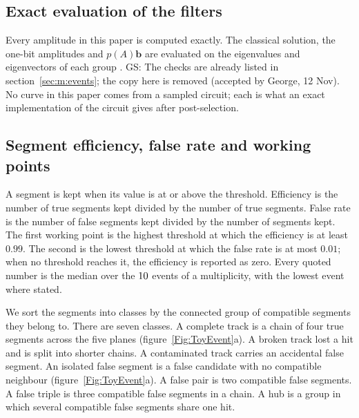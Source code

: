 \documentclass[11pt,a4paper]{article}
\newcommand{\gs}[1]{{\color{orange!85!black} GS: #1 }}
\newcommand{\gss}[1]{{\color{teal} #1}}
\begin{document}
\subsection{Exact evaluation of the filters}\label{sec:m:evaluation}
Every amplitude in this paper is computed exactly. The classical solution, the one-bit amplitudes
and $p(A)\mathbf{b}$ are evaluated on the eigenvalues and eigenvectors of each group\gss{.} \gs{The checks are already listed in section~\mbox{\ref{sec:m:events}}; the copy here is removed (accepted by George, 12 Nov).}  No curve in this paper comes from a sampled circuit;
each is what an exact implementation of the circuit gives after post-selection.

\subsection{Segment efficiency, false rate and working points}\label{sec:m:metrics}
A segment is kept when its value is at or above the threshold. Efficiency is the number of true
segments kept divided by the number of true segments. False rate is the number of false segments
kept divided by the number of segments kept. The first working point is the highest threshold at
which the efficiency is at least $0.99$. The second is the lowest threshold at which the false rate
is at most $0.01$; when no threshold reaches it, the efficiency is reported as zero. Every quoted
number is the median over the $10$ events of a multiplicity, with the lowest event where
stated.

\gss{We sort the segments into classes by the connected group of compatible segments they belong to. There are seven classes. A complete track is a chain of four true segments across the five planes (figure~\ref{Fig:ToyEvent}a). A broken track lost a hit and is split into shorter chains. A contaminated track carries an accidental false segment. An isolated false segment is a false candidate with no compatible neighbour (figure~\ref{Fig:ToyEvent}a). A false pair is two compatible false segments. A false triple is three compatible false segments in a chain. A hub is a group in which several compatible false segments share one hit.}
\end{document}
